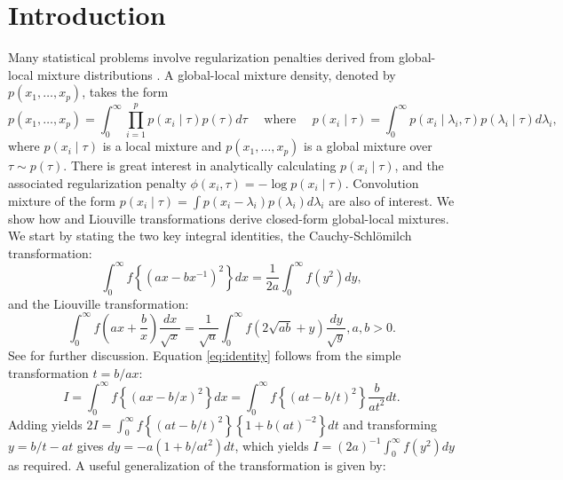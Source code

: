 \documentclass[lineno]{biometrika}
\begin{document}
\section{Introduction}
Many statistical problems involve regularization penalties derived from global-local mixture distributions \citep{polson2011data, hans2011comment,bhadra2015horseshoe+}. A global-local mixture density, denoted by $p(x_1, \ldots, x_p)$, takes the form 
\begin{equation*}
p(x_1, \ldots, x_p) = \int_{0}^{\infty}\prod_{i=1}^{p}  p(x_i \mid \tau) p(\tau) d\tau \quad \text{ where } \quad
p( x_i \mid \tau) = \int_{0}^{\infty} p(x_i \mid \lambda_i, \tau) p(\lambda_i \mid \tau) d\lambda_i, 
\end{equation*}
where $p(x_i \mid \tau)$ is a local mixture and $p(x_1, \ldots, x_p)$ is a global mixture over $\tau \sim p(\tau)$. There is great interest in analytically calculating $p(x_i \mid \tau)$, and the associated regularization penalty $\phi(x_i, \tau) = -\log p(x_i \mid \tau)$. Convolution mixture of the form $p(x_i \mid \tau) = \int p(x_i - \lambda_i) p(\lambda_i) d \lambda_i$ are also of interest. We show how \CS and Liouville transformations derive closed-form global-local mixtures. 
We start by stating the two key integral identities, the Cauchy-Schl\"omilch transformation: 
\begin{equation}
\int_0^\infty f \left\{ ( a x - b x^{-1} )^2 \right\} d x = \frac{1}{2a} \int_0^\infty f(y^2) d y, \label{eq:identity}
\end{equation}
and the Liouville transformation:
\begin{equation}
\int_{0}^{\infty} f\left(ax + \frac{b}{x} \right) \frac{dx}{\sqrt{x}} = \frac{1}{\sqrt{a}} \int_{0}^{\infty} f \left( 2\sqrt{ab} + y \right) \frac{dy}{\sqrt{y}}, a,b >0. \label{eq:liouville}
\end{equation}
See \cite{boros2006irresistible,baker2008probabilistic,amdeberhan2010cauchy,jones2014generating} for further discussion.  
Equation \eqref{eq:identity} follows from the simple transformation $t = b/ax$: 
\begin{equation*}
  I = \int_{0}^{\infty} f \left\{(ax - b/x)^2 \right\} dx = \int_{0}^{\infty} f \left\{(at - b/t)^2 \right\} \frac{b}{at^2} dt.
\end{equation*}
Adding yields $2 I = \int_{0}^{\infty} f \left\{(at - b/t)^2 \right\} \left\{ 1+b (at)^{-2} \right\} dt$ and transforming $y = b/t - at$ gives $dy = -a (1+b/at^2) dt$, which yields $I = (2a)^{-1} \int_{0}^{\infty} f(y^2) dy$ as required. A useful generalization of the \CS transformation is given by: 
\end{document}
